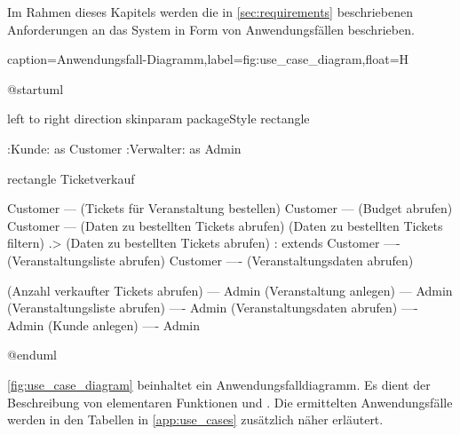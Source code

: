 Im Rahmen dieses Kapitels werden die in \autoref{sec:requirements} beschriebenen Anforderungen an das System in Form von Anwendungsfällen beschrieben. 

\begin{dhbwfigure}{caption=Anwendungsfall-Diagramm,label=fig:use_case_diagram,float=H}
    \begin{plantuml}
        @startuml

            left to right direction
            skinparam packageStyle rectangle

            :Kunde: as Customer
            :Verwalter: as Admin

            rectangle Ticketverkauf {
                Customer --- (Tickets für Veranstaltung bestellen)
                Customer --- (Budget abrufen)
                Customer --- (Daten zu bestellten Tickets abrufen)
                (Daten zu bestellten Tickets filtern) .> (Daten zu bestellten Tickets abrufen) : extends
                Customer ---- (Veranstaltungsliste abrufen)
                Customer ---- (Veranstaltungsdaten abrufen)

                (Anzahl verkaufter Tickets abrufen) --- Admin
                (Veranstaltung anlegen) --- Admin
                (Veranstaltungsliste abrufen) ---- Admin
                (Veranstaltungsdaten abrufen) ---- Admin
                (Kunde anlegen) ---- Admin
            }
        @enduml
    \end{plantuml}
\end{dhbwfigure}

\autoref{fig:use_case_diagram} beinhaltet ein Anwendungsfalldiagramm.
Es dient der Beschreibung von elementaren Funktionen und .
Die ermittelten Anwendungsfälle werden in den Tabellen in \autoref{app:use_cases} zusätzlich näher erläutert.
